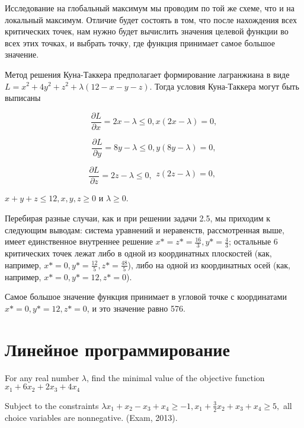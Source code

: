 \begin{solution}
Исследование на глобальный максимум мы проводим по той же схеме, что и на локальный максимум. Отличие будет состоять в том, что после нахождения всех критических точек, нам нужно будет вычислить значения целевой функции во всех этих точках, и выбрать точку, где функция принимает самое большое значение.

Метод решения Куна-Таккера предполагает формирование лагранжиана в виде $L=x^{2} +4y^{2} +z^{2} +\lambda (12-x-y-z)$. Тогда условия Куна-Таккера могут быть выписаны

\[\frac{\partial L}{\partial x} =2x-\lambda \le 0, x(2x-\lambda )=0,\] 

\[\frac{\partial L}{\partial y} =8y-\lambda \le 0, y(8y-\lambda )=0,\] 

\[\frac{\partial L}{\partial z} =2z-\lambda \le 0,  \begin{array}{l} {z(2z-\lambda )=0,} \\ {} \end{array}\] 

$x+y+z\le 12, x,y,z\ge 0$ и $\lambda \ge 0.$

Перебирая разные случаи, как и при решении задачи 2.5, мы приходим к следующим выводам: система уравнений и неравенств, рассмотренная выше, имеет единственное внутреннее решение $x*=z*=\frac{16}{3} , y*=\frac{4}{3} $; остальные 6 критических точек лежат либо в одной из координатных плоскостей (как, например, $x*=0, y*=\frac{12}{5} , z*=\frac{48}{5} $), либо на одной из координатных осей (как, например, $x*=0, y*=12, z*=0$).

Самое большое значение функция принимает в угловой точке с координатами $x*=0, y*=12, z*=0$, и это значение равно 576.
\end{solution}



\section{Линейное программирование}

\begin{problem}
For any real number $\lambda $, find the minimal value of the objective function $x_{1} +6x_{2} +2x_{3} +4x_{4} $

Subject to the constraints $\lambda x_{1} +x_{2} -x_{3} +x_{4} \ge -1,  x_{1} +\frac{3}{2} x_{2} +x_{3} +x_{4} \ge 5,$ all choice variables are nonnegative. (Exam, 2013).
\end{problem}


